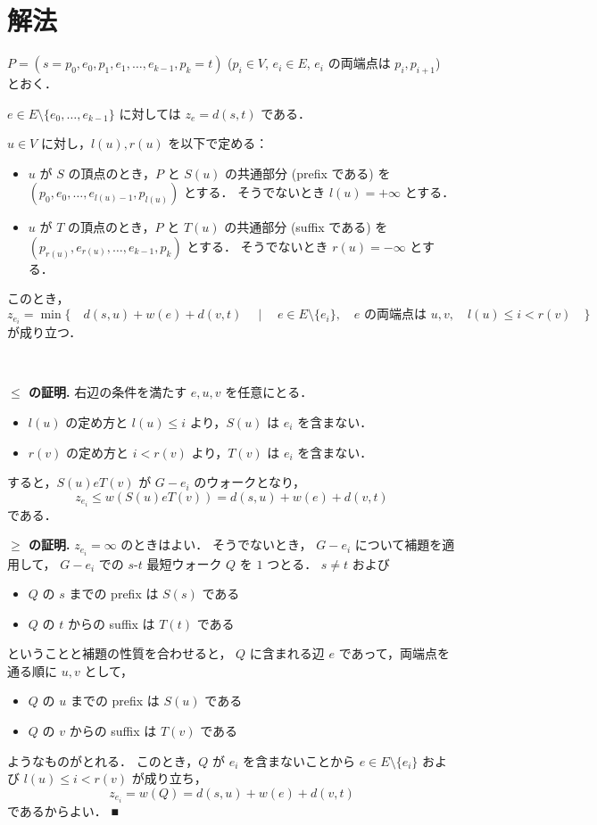 \documentclass{jsarticle}
\begin{document}
\section{解法}
$P = (s = p_0, e_0, p_1, e_1, \ldots, e_{k-1}, p_k = t)$
($p_i \in V$, $e_i \in E$, $e_i$ の両端点は $p_i, p_{i+1}$)
とおく．

$e \in E \setminus \{e_0, \ldots, e_{k-1}\}$ に対しては
$z_e = d(s, t)$ である．

$u \in V$ に対し，$l(u), r(u)$ を以下で定める：
\begin{itemize}
  \item $u$ が $S$ の頂点のとき，$P$ と $S(u)$ の共通部分 (prefix である) を
      $(p_0, e_0, \ldots, e_{l(u)-1}, p_{l(u)})$ とする．
      そうでないとき $l(u) = +\infty$ とする．
  \item $u$ が $T$ の頂点のとき，$P$ と $T(u)$ の共通部分 (suffix である) を
      $(p_{r(u)}, e_{r(u)}, \ldots, e_{k-1}, p_k)$ とする．
      そうでないとき $r(u) = -\infty$ とする．
\end{itemize}

このとき，
\[
  z_{e_i}
  = \min\{ \quad
      d(s, u) + w(e) + d(v, t)
      \quad \mid \quad
      e \in E \setminus \{e_i\},\quad \text{$e$ の両端点は $u, v$},\quad l(u) \le i < r(v)
  \quad \}
\]
が成り立つ．

\

\noindent\textbf{$\le$ の証明.}
右辺の条件を満たす $e, u, v$ を任意にとる．
\begin{itemize}
  \item $l(u)$ の定め方と $l(u) \le i$ より，$S(u)$ は $e_i$ を含まない．
  \item $r(v)$ の定め方と $i <   r(v)$ より，$T(v)$ は $e_i$ を含まない．
\end{itemize}

すると，$S(u) e T(v)$ が $G-e_i$ のウォークとなり，
\[
  z_{e_i} \le w(S(u) e T(v)) = d(s, u) + w(e) + d(v, t)
\]
である．

\noindent\textbf{$\ge$ の証明.}
$z_{e_i} = \infty$ のときはよい．
そうでないとき，
$G-e_i$ について補題を適用して，
$G-e_i$ での $s$-$t$ 最短ウォーク $Q$ を $1$ つとる．
$s \ne t$ および
\begin{itemize}
  \item $Q$ の $s$ までの prefix は $S(s)$ である
  \item $Q$ の $t$ からの suffix は $T(t)$ である
\end{itemize}
ということと補題の性質を合わせると，
$Q$ に含まれる辺 $e$ であって，両端点を通る順に $u, v$ として，
\begin{itemize}
  \item $Q$ の $u$ までの prefix は $S(u)$ である
  \item $Q$ の $v$ からの suffix は $T(v)$ である
\end{itemize}
ようなものがとれる．
このとき，$Q$ が $e_i$ を含まないことから
$e \in E \setminus \{e_i\}$ および $l(u) \le i < r(v)$ が成り立ち，
\[
  z_{e_i} = w(Q) = d(s, u) + w(e) + d(v, t)
\]
であるからよい．
\hfill ■
\end{document}
